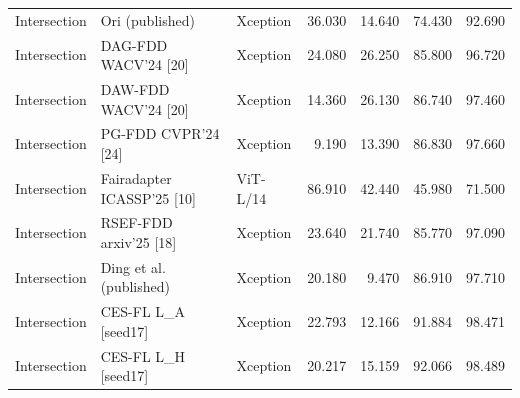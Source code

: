 \begin{table}[t]
{\begin{tabular}{lllrrrr}
Intersection & Ori (published) & Xception & 36.030 & 14.640 & 74.430 & 92.690 \\
Intersection & DAG-FDD WACV’24 [20] & Xception & 24.080 & 26.250 & 85.800 & 96.720 \\
Intersection & DAW-FDD WACV’24 [20] & Xception & 14.360 & 26.130 & 86.740 & 97.460 \\
Intersection & PG-FDD CVPR’24 [24] & Xception & 9.190 & 13.390 & 86.830 & 97.660 \\
Intersection & Fairadapter ICASSP’25 [10] & ViT-L/14 & 86.910 & 42.440 & 45.980 & 71.500 \\
Intersection & RSEF-FDD arxiv’25 [18] & Xception & 23.640 & 21.740 & 85.770 & 97.090 \\
Intersection & Ding et al. (published) & Xception & 20.180 & 9.470 & 86.910 & 97.710 \\
Intersection & CES-FL L\_A [seed17] & Xception & 22.793 & 12.166 & 91.884 & 98.471 \\
Intersection & CES-FL L\_H [seed17] & Xception & 20.217 & 15.159 & 92.066 & 98.489 \\
\bottomrule
\end{tabular}}
\end{table}

